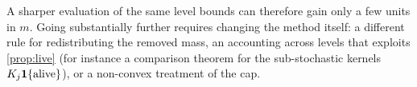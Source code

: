 A sharper evaluation of the same level bounds can therefore gain only a few units in $m$. Going substantially
further requires changing the method itself: a different rule for redistributing the removed mass, an accounting
across levels that exploits \cref{prop:live} (for instance a comparison theorem for the sub-stochastic kernels
$K_j\mathbf{1}\{\text{alive}\}$), or a non-convex treatment of the cap.
